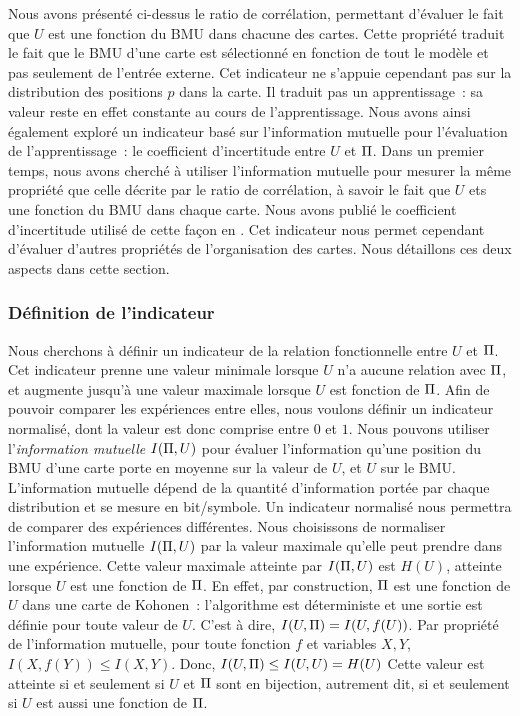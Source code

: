 \documentclass[../main]{subfiles}
\begin{document}
Nous avons présenté ci-dessus le ratio de corrélation, permettant d'évaluer le fait que $U$ est une fonction du BMU dans chacune des cartes. Cette propriété traduit le fait que le BMU d'une carte est sélectionné en fonction de tout le modèle et pas seulement de l'entrée externe.
Cet indicateur ne s'appuie cependant pas sur la distribution des positions $p$ dans la carte. Il traduit pas un apprentissage~: sa valeur reste en effet constante au cours de l'apprentissage.
Nous avons ainsi également exploré un indicateur basé sur l'information mutuelle pour l'évaluation de l'apprentissage~: le coefficient d'incertitude entre $U$ et $\Pi$.
Dans un premier temps, nous avons cherché à utiliser l'information mutuelle pour mesurer la même propriété que celle décrite par le ratio de corrélation, à savoir le fait que $U$ ets une fonction du BMU dans chaque carte. Nous avons publié le coefficient d'incertitude utilisé de cette façon en \cite{Gonnier2020ConsensusDS}.
Cet indicateur nous permet cependant d'évaluer d'autres propriétés de l'organisation des cartes. Nous détaillons ces deux aspects dans cette section.

\subsubsection{Définition de l'indicateur}

Nous cherchons à définir un indicateur de la relation fonctionnelle entre $U$ et $\Pi$. Cet indicateur prenne une valeur minimale lorsque $U$ n'a aucune relation avec $\Pi$, et augmente jusqu'à une valeur maximale lorsque $U$ est fonction de $\Pi$. Afin de pouvoir comparer les expériences entre elles, nous voulons définir un indicateur normalisé, dont la valeur est donc comprise entre $0$ et $1$.
Nous pouvons utiliser l'\emph{information mutuelle} $I(\Pi, U)$ pour évaluer l'information qu'une position du BMU d'une carte porte en moyenne sur la valeur de $U$, et $U$ sur le BMU. L'information mutuelle dépend de la quantité d'information portée par chaque distribution et se mesure en bit/symbole. 
Un indicateur normalisé nous permettra de comparer des expériences différentes. 
Nous choisissons de normaliser l'information mutuelle $I(\Pi,U)$  par la valeur maximale qu'elle peut prendre dans une expérience. Cette valeur maximale atteinte par $I(\Pi,U)$ est $H(U)$, atteinte lorsque $U$ est une fonction de $\Pi$.
En effet, par construction, $\Pi$ est une fonction de $U$ dans une carte de Kohonen~: l'algorithme est déterministe et une sortie est définie pour toute valeur de $U$. C'est à dire, $I(U,\Pi) = I (U, f(U))$.
Par propriété de l'information mutuelle, pour toute fonction $f$ et variables $X,Y$, $I(X,f(Y)) \leq I(X,Y) $. 
Donc, $I(U,\Pi) \leq I(U,U) = H(U)$
Cette valeur est atteinte si et seulement si $U$ et $\Pi$ sont en bijection, autrement dit, si et seulement si $U$ est aussi une fonction de $\Pi$.
\end{document}
